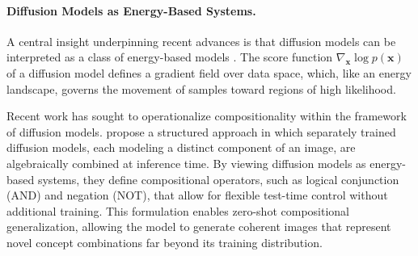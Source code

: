\paragraph{Diffusion Models as Energy-Based Systems.}
A central insight underpinning recent advances is that diffusion models can be interpreted as a class of energy-based models \citep{du2023reduce}.  
The score function $\nabla_\mathbf{x}\log p(\mathbf{x})$ of a diffusion model defines a gradient field over data space, which, like an energy landscape, governs the movement of samples toward regions of high likelihood.  

Recent work has sought to operationalize compositionality within the framework of diffusion models.  
\citet{liu2022compositional} propose a structured approach in which separately trained diffusion models, each modeling a distinct component of an image, are algebraically combined at inference time.  
By viewing diffusion models as energy-based systems, they define compositional operators, such as logical conjunction (AND) and negation (NOT), that allow for flexible test-time control without additional training.  
This formulation enables zero-shot compositional generalization, allowing the model to generate coherent images that represent novel concept combinations far beyond its training distribution.



